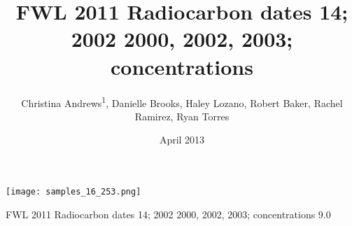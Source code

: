\documentclass{article}
\title{FWL 2011 Radiocarbon dates 14; 2002 2000, 2002, 2003; concentrations}
\author{Christina Andrews\textsuperscript{1},  Danielle Brooks,  Haley Lozano,  Robert Baker,  Rachel Ramirez,  Ryan Torres}
\affil{\textsuperscript{1}Korea Institute of Science and Technology Information (KISTI)}
\date{April 2013}
\begin{document}
\maketitle

\begin{center}
\begin{minipage}{0.75\linewidth}
\texttt{[image: samples\_16\_253.png]}
\end{minipage}
\end{center}

FWL 2011 Radiocarbon dates 14; 2002 2000, 2002, 2003; concentrations 9.0%
\end{document}
